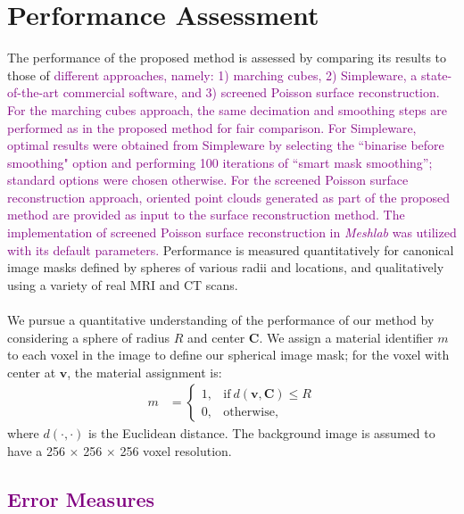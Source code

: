 \section{Performance Assessment}
%

The performance of the proposed method is assessed by comparing its results to those of \textcolor{purple}{different approaches, namely: 1) marching cubes, 2) Simpleware, a state-of-the-art commercial software, and 3) screened Poisson surface reconstruction. For the marching cubes approach, the same decimation and smoothing steps are performed as in the proposed method for fair comparison. For Simpleware, optimal results were obtained from \textcolor{purple}{Simpleware} by selecting the ``binarise before smoothing" option and performing 100 iterations of ``smart mask smoothing''; standard options were chosen otherwise. For the screened Poisson surface reconstruction approach, oriented point clouds generated as part of the proposed method are provided as input to the surface reconstruction method. The implementation of screened Poisson surface reconstruction in \textit{Meshlab} was utilized with its default parameters.} Performance is measured quantitatively for canonical image masks defined by spheres of various radii and locations, and qualitatively using a variety of real MRI and CT scans. \\ \\
%
We pursue a quantitative understanding of the performance of our method by considering a sphere of radius $R$ and center $\bm{C}$.  We assign a material identifier $m$ to each voxel in the image to define our spherical image mask; for the voxel with center at $\bm{v}$, the material assignment is:
\begin{align} 
	m &=  \begin{cases}
		1, & \text{if}\ d \left(\bm{v},\bm{C}\right) \le R \\
		0, & \text{otherwise},
	\end{cases}
\end{align}
where $d(\cdot,\cdot)$ is the Euclidean distance. The background image is assumed to have a 256 $\times$ 256 $\times$ 256 voxel resolution.
\subsection{\textcolor{purple}{Error Measures}}
\label{Error Measures}

